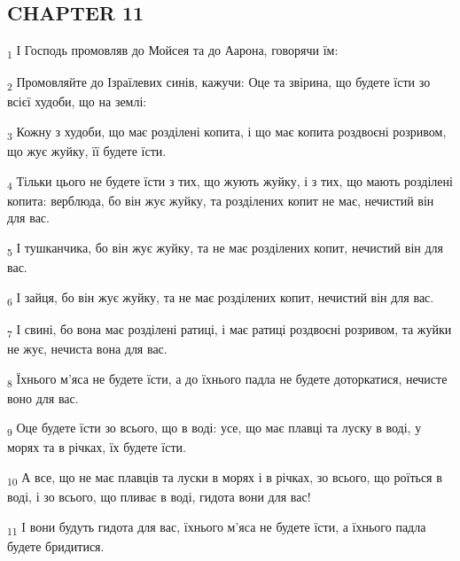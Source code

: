 \subsection{CHAPTER 11}
\begin{tcolorbox}
\textsubscript{1} І Господь промовляв до Мойсея та до Аарона, говорячи їм:
\end{tcolorbox}
\begin{tcolorbox}
\textsubscript{2} Промовляйте до Ізраїлевих синів, кажучи: Оце та звірина, що будете їсти зо всієї худоби, що на землі:
\end{tcolorbox}
\begin{tcolorbox}
\textsubscript{3} Кожну з худоби, що має розділені копита, і що має копита роздвоєні розривом, що жує жуйку, її будете їсти.
\end{tcolorbox}
\begin{tcolorbox}
\textsubscript{4} Тільки цього не будете їсти з тих, що жують жуйку, і з тих, що мають розділені копита: верблюда, бо він жує жуйку, та розділених копит не має, нечистий він для вас.
\end{tcolorbox}
\begin{tcolorbox}
\textsubscript{5} І тушканчика, бо він жує жуйку, та не має розділених копит, нечистий він для вас.
\end{tcolorbox}
\begin{tcolorbox}
\textsubscript{6} І зайця, бо він жує жуйку, та не має розділених копит, нечистий він для вас.
\end{tcolorbox}
\begin{tcolorbox}
\textsubscript{7} І свині, бо вона має розділені ратиці, і має ратиці роздвоєні розривом, та жуйки не жує, нечиста вона для вас.
\end{tcolorbox}
\begin{tcolorbox}
\textsubscript{8} Їхнього м'яса не будете їсти, а до їхнього падла не будете доторкатися, нечисте воно для вас.
\end{tcolorbox}
\begin{tcolorbox}
\textsubscript{9} Оце будете їсти зо всього, що в воді: усе, що має плавці та луску в воді, у морях та в річках, їх будете їсти.
\end{tcolorbox}
\begin{tcolorbox}
\textsubscript{10} А все, що не має плавців та луски в морях і в річках, зо всього, що роїться в воді, і зо всього, що пливає в воді, гидота вони для вас!
\end{tcolorbox}
\begin{tcolorbox}
\textsubscript{11} І вони будуть гидота для вас, їхнього м'яса не будете їсти, а їхнього падла будете бридитися.
\end{tcolorbox}
